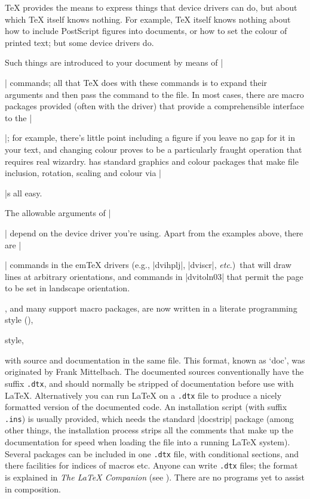 
\TeX{} provides the means to express things that device drivers can
do, but about which \TeX{} itself knows nothing.  For example, \TeX{}
itself knows nothing about how to include PostScript figures into
documents, or how to set the colour of printed text; but some device
drivers do.

Such things are introduced to your document by means of |\special|
commands; all that \TeX{} does with these commands is to expand their
arguments and then pass the command to the  file.  In most
cases, there are macro packages provided (often with the driver) that
provide a comprehensible interface to the |\special|; for example,
there's little point including a figure if you leave no gap for it in
your text, and changing colour proves to be a particularly fraught
operation that requires real wizardry. \LaTeXe{}
has standard graphics and colour packages that make file inclusion,
rotation, scaling and colour via |\special|s all easy.

The allowable arguments of |\special| depend on the device driver
you're using.  Apart from the examples above, there are |\special|
commands in the em\TeX{} drivers (e.g., \ProgName|dvihplj|, \ProgName|dviscr|,
\emph{etc}.)~that will draw lines at arbitrary orientations, and
commands in \ProgName|dvitoln03| that permit the page to be set in
landscape orientation.


\LaTeXe{}, and many support macro packages, are now written in a
\htmlignore
literate programming style (),
\endhtmlignore
\begin{htmlversion}
   style,
\end{htmlversion}
with source and documentation in the
same file.  This format, known as `doc', was originated by Frank
Mittelbach. The documented sources conventionally have the suffix
\texttt{.dtx}, and should normally be stripped of documentation
before use with \LaTeX{}.  Alternatively you can run \LaTeX{} on a
\texttt{.dtx} file to produce a nicely formatted version of the
documented code. An installation script (with suffix
\texttt{.ins}) is usually provided, which needs the standard \LaTeXe{}
\ProgName|docstrip| package (among other things, the installation
process strips all the comments that make up the documentation for
speed when loading the file into a running \LaTeX{} system).  Several
packages can be included in one \texttt{.dtx} file, with conditional
sections, and there facilities for indices of macros etc.  Anyone can
write \texttt{.dtx} files; the format is explained in
\emph{The \LaTeX{} Companion}
(see ). There are
no programs yet to assist in composition.

